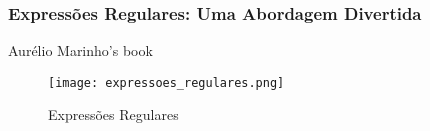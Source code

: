 \begin{frame}[fragile]
  \frametitle{Expressões Regulares: Uma Abordagem Divertida}
  Aurélio Marinho's book~\cite{jargas2016expressoes}
  \begin{figure}
    \centering
    \texttt{[image: expressoes\_regulares.png]}
    \caption{Expressões Regulares}
    \label{fig:expressoes-regulares}
  \end{figure}
\end{frame}
